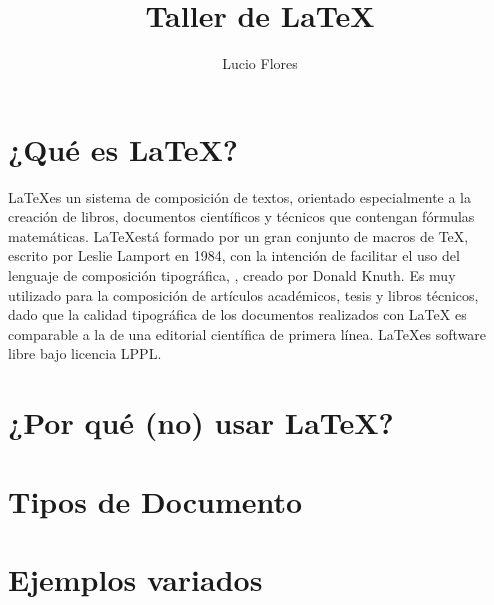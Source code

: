 \documentclass[10pt,a4paper,final,oneside,onecolumn,notitlepage]{article}
\author{Lucio Flores}
\title{Taller de \LaTeX }
\begin{document}
\maketitle
{}


\section{¿Qu\'e es \LaTeX?}{
\LaTeX es un sistema de composición de textos, orientado especialmente a la creación de libros, documentos científicos y técnicos que contengan fórmulas matemáticas. \LaTeX está formado por un gran conjunto de macros de \TeX, escrito por Leslie Lamport en 1984, con la intención de facilitar el uso del lenguaje de composición tipográfica, , creado por Donald Knuth. Es muy utilizado para la composición de artículos académicos, tesis y libros técnicos, dado que la calidad tipográfica de los documentos realizados con LaTeX es comparable a la de una editorial científica de primera línea. \LaTeX es software libre bajo licencia LPPL.
}

\section{¿Por qu\'e (no) usar \LaTeX?}
\section{Tipos de Documento}
\section{Ejemplos variados}
\end{document}
